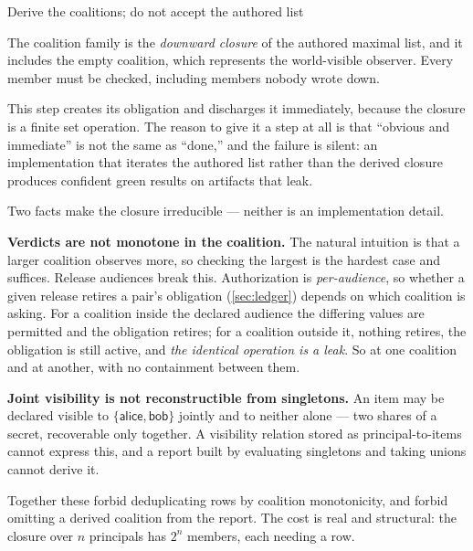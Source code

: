 \begin{step}{Derive the coalitions; do not accept the authored list}{%
}
\label{step:coalitions}

The coalition family is the \emph{downward closure} of the authored maximal
list, and it includes the empty coalition, which represents the world-visible
observer. Every member must be checked, including members nobody wrote down.

This step creates its obligation and discharges it immediately, because the
closure is a finite set operation. The reason to give it a step at all is that
``obvious and immediate'' is not the same as ``done,'' and the failure is silent:
an implementation that iterates the authored list rather than the derived closure
produces confident green results on artifacts that leak.

Two facts make the closure irreducible --- neither is an implementation detail.

\textbf{Verdicts are not monotone in the coalition.} The natural intuition is
that a larger coalition observes more, so checking the largest is the hardest
case and suffices. Release audiences break this. Authorization is
\emph{per-audience}, so whether a given release retires a pair's obligation
(\cref{sec:ledger}) depends on which coalition is asking. For a coalition inside
the declared audience the differing values are permitted and the obligation
retires; for a coalition outside it, nothing retires, the obligation is still
active, and \emph{the identical operation is a leak}. So \Verified{} at one
coalition and \Unsafe{} at another, with no containment between them.

\textbf{Joint visibility is not reconstructible from singletons.} An item may be
declared visible to $\{\textsf{alice},\textsf{bob}\}$ jointly and to neither
alone --- two shares of a secret, recoverable only together. A visibility
relation stored as principal-to-items cannot express this, and a report built by
evaluating singletons and taking unions cannot derive it.

Together these forbid deduplicating rows by coalition monotonicity, and forbid
omitting a derived coalition from the report. The cost is real and structural:
the closure over $n$ principals has $2^n$ members, each needing a row.
\end{step}

